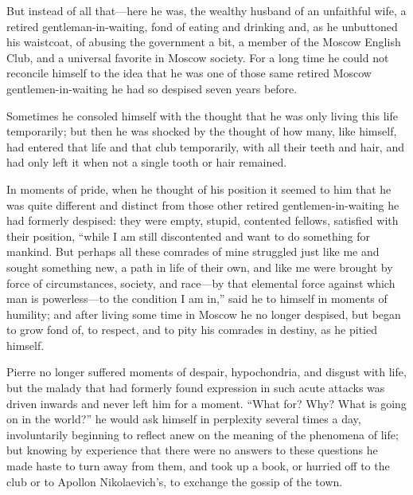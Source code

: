 But instead of all that---here he was, the wealthy husband of an
unfaithful wife, a retired gentleman-in-waiting, fond of eating
and drinking and, as he unbuttoned his waistcoat, of abusing the
government a bit, a member of the Moscow English Club, and a
universal favorite in Moscow society. For a long time he could
not reconcile himself to the idea that he was one of those same
retired Moscow gentlemen-in-waiting he had so despised seven
years before.

Sometimes he consoled himself with the thought that he was only
living this life temporarily; but then he was shocked by the
thought of how many, like himself, had entered that life and that
club temporarily, with all their teeth and hair, and had only
left it when not a single tooth or hair remained.

In moments of pride, when he thought of his position it seemed to
him that he was quite different and distinct from those other
retired gentlemen-in-waiting he had formerly despised: they were
empty, stupid, contented fellows, satisfied with their position,
``while I am still discontented and want to do something for
mankind. But perhaps all these comrades of mine struggled just
like me and sought something new, a path in life of their own,
and like me were brought by force of circumstances, society, and
race---by that elemental force against which man is
powerless---to the condition I am in,'' said he to himself in
moments of humility; and after living some time in Moscow he no
longer despised, but began to grow fond of, to respect, and to
pity his comrades in destiny, as he pitied himself.

Pierre no longer suffered moments of despair, hypochondria, and
disgust with life, but the malady that had formerly found
expression in such acute attacks was driven inwards and never
left him for a moment. ``What for? Why? What is going on in the
world?'' he would ask himself in perplexity several times a day,
involuntarily beginning to reflect anew on the meaning of the
phenomena of life; but knowing by experience that there were no
answers to these questions he made haste to turn away from them,
and took up a book, or hurried off to the club or to Apollon
Nikolaevich's, to exchange the gossip of the town.

